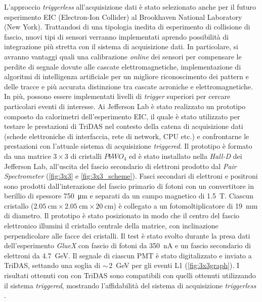 \documentclass[../main.tex]{subfiles}
\begin{document}
L'approccio \emph{triggerless} all'acquisizione dati è stato selezionato anche per il futuro esperimento EIC (Electron-Ion Collider) al Brookhaven National Laboratory (New York). Trattandosi di una tipologia inedita di esperimento di collisione di fascio, nuovi tipi di sensori verranno implementati aprendo possibilità di integrazione più stretta con il sistema di acquisizione dati. In particolare, si avranno vantaggi quali una calibrazione \emph{online} dei sensori per compensare le perdite di segnale dovute alle cascate elettromagnetiche, implementazione di algoritmi di intelligenza artificiale per un migliore riconoscimento dei pattern e delle tracce e più accurata distinzione tra cascate acroniche e elettromagnetiche. In più, possono essere implementati livelli di \emph{trigger} superiori per cercare particolari eventi di interesse. 
Ai Jefferson Lab è stato realizzato un prototipo composto da calorimetri dell'esperimento EIC, il quale è stato utilizzato per testare le prestazioni di TriDAS nel contesto della catena di acquisizione dati (schede elettroniche di interfaccia, rete di network, CPU etc.) e confrontarne le prestazioni con l'attuale sistema di acquisizione \emph{triggered}. 
Il prototipo è formato da una matrice $3 \times 3$ di cristalli $PbWO_4$ ed è stato installato nella \emph{Hall-D} dei Jefferson Lab, all'uscita del fascio secondario di elettroni prodotto dal \emph{Pair Spectrometer} (\autoref{fig:3x3} e \autoref{fig:3x3_scheme}). Fasci secondari di elettroni e positroni sono prodotti dall'interazione del fascio primario di fotoni con un convertitore in berillio di spessore \SI{750}{\micro\m} e separati da un campo magnetico di \SI{1.5}{\tesla}. 
Ciascun cristallo ($\SI{2.05}{\cm} \times \SI{2.05}{\cm} \times \SI{20}{\cm}$) è collegato a un fotomoltiplicatore di \SI{19}{\mm} di diametro. 
Il prototipo è stato posizionato in modo che il centro del fascio elettronico illumini il cristallo centrale della matrice, con inclinazione perpendicolare alle facce dei cristalli.   
Il test è stato svolto durante la presa dati dell'esperimento \emph{GlueX} con fascio di fotoni da \SI{350}{\nano\ampere} e un fascio secondario di elettroni da \SI{4.7}{\GeV}.
Il segnale di ciascun PMT è stato digitalizzato e inviato a TriDAS, settando una soglia di $\small \sim$\SI{2}{\GeV} per gli eventi L1 (\autoref{fig:3x3graph}).
I risultati ottenuti con con TriDAS sono compatibili con quelli ottenuti utilizzando il sistema \emph{triggered}, mostrando l'affidabilità del sistema di acquisizione \emph{triggerless} \cite{3x3telescope}.
\end{document}
